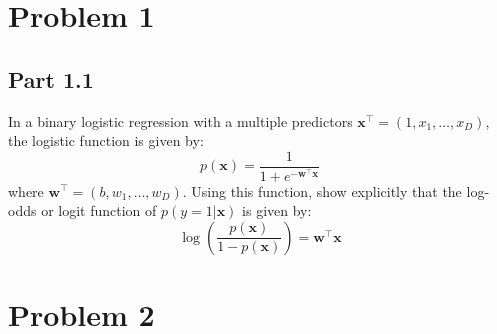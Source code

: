 \documentclass[11pt,twoside]{article}
\newcommand{\pts}[1]{\marginpar{ \small\hspace{0pt} \textit{[#1]} } }
\newcommand{\lt}{\left}
\newcommand{\rt}{\right}
\newcommand{\?}{\stackrel{?}{=}}
\newcommand{\fr}{\frac}
\begin{document}



\section*{Problem 1 }

\subsection*{Part 1.1}
In a binary logistic regression with a multiple predictors $\bm x^\intercal = (1, x_1,\ldots,x_D)$, \pts{4}
the logistic function is given by:
\begin{equation}
  \label{eq:1}
  p(\bm x) = \fr{1}{1 + e^{-\bm w^\intercal \bm x}}
\end{equation}
where $\bm w^\intercal = (b, w_1, \ldots, w_D) $.
Using this function, show explicitly that the log-odds or logit function of $p(y=1|\bm x)$ is given by:
\begin{equation}
  \label{eq:2}
  \log\lt(\fr{p(\bm x)}{1 - p(\bm x)}\rt) = \bm w^\intercal \bm x
\end{equation}



\section*{Problem 2 }
\end{document}
